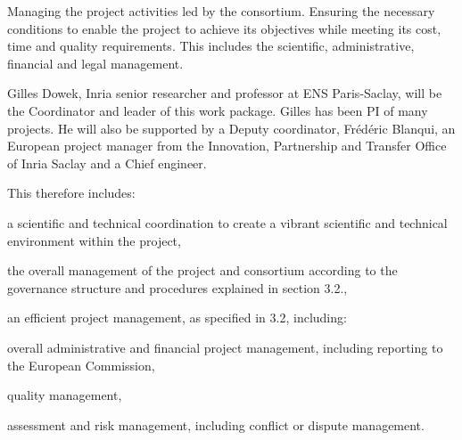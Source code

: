 \begin{workpackage}[id=management,type=MGT,wphases=1-48,
  short=Management,
  title=Management,
  lead=Inr,InrRM=34,InnRM=2,SacRM=2,TumRM=2,LieRM=2,BelRM=2,DelRM=2,FauRM=2]
  
  \begin{wpobjectives}
    Managing the
    project activities led by the consortium. Ensuring the necessary
    conditions to enable
    the project to achieve its objectives while meeting its cost, time
    and quality requirements. This includes the scientific,
    administrative, financial and legal management.

    Gilles Dowek, Inria senior researcher and professor at ENS
    Paris-Saclay, will be the Coordinator and leader of this work
    package. Gilles has been PI of many projects. He will also be
    supported by a Deputy coordinator, Frédéric Blanqui, an European
    project manager from the Innovation, Partnership and Transfer
    Office of Inria Saclay and a Chief engineer.

This therefore includes:
\begin{compactitem}
\item a scientific and technical coordination to create a vibrant scientific and technical environment within the project,
\item the overall management of the project and consortium according to the governance structure and procedures explained in section 3.2.,
\item an efficient project management, as specified in 3.2, including:
  \begin{compactitem}
  \item overall administrative and financial project management, including reporting to the European Commission,
  \item quality management,
  \item assessment and risk management, including conflict or dispute management.
  \end{compactitem}
\end{compactitem}
\end{wpobjectives}


\end{workpackage}

